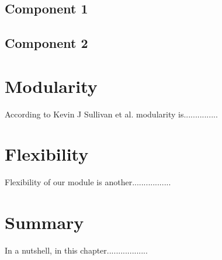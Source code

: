 \subsection{Component 1}


\subsection{Component 2}


\section{Modularity}
According to Kevin J Sullivan et al. modularity is...............

\section{Flexibility}
Flexibility of our module is another.................

\section{Summary}
In a nutshell, in this chapter..................
